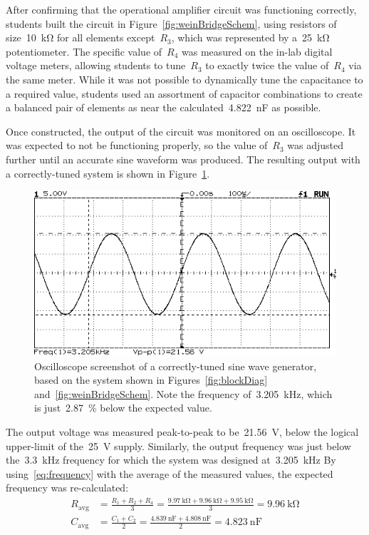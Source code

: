 After confirming that the operational amplifier circuit was functioning
correctly, students built the circuit in Figure~\ref{fig:weinBridgeSchem},
using resistors of size~\SI{10}{\kilo\ohm} for all elements except~$R_3$, which
was represented by a~\SI{25}{\kilo\ohm} potentiometer.  The specific value
of~$R_4$ was measured on the in-lab digital voltage meters, allowing students
to tune~$R_3$ to exactly twice the value of~$R_4$ via the same meter.  While it
was not possible to dynamically tune the capacitance to a required value,
students used an assortment of capacitor combinations to create a balanced pair
of elements as near the calculated~\SI{4.822}{\nano\farad} as possible.

Once constructed, the output of the circuit was monitored on an oscilloscope.
It was expected to not be functioning properly, so the value of~$R_3$ was
adjusted further until an accurate sine waveform was produced.  The resulting
output with a correctly-tuned system is shown in Figure~\ref{fig:goodShot}.
%
\begin{figure}[H]
	\centering
	\includegraphics[width=.6\textwidth]{img/shot/pt2shot.png}
	\parbox{.6\textwidth}{
	\caption[Oscilloscope Screenshot --- Functioning System]{Oscilloscope
	screenshot of a correctly-tuned sine wave generator, based on the system
	shown in Figures~\ref{fig:blockDiag} and~\ref{fig:weinBridgeSchem}.  Note
	the frequency of~\SI{3.205}{\kilo\hertz}, which is just~\SI{2.87}{\percent}
	below the expected value.}
	\label{fig:goodShot}}
\end{figure}
%
The output voltage was measured peak-to-peak to be~\SI{21.56}{\volt}, below the
logical upper-limit of the~\SI{25}{\volt} supply.  Similarly, the output
frequency was just below the~\SI{3.3}{\kilo\hertz} frequency for which the
system was designed at~\SI{3.205}{\kilo\hertz}  By using~\eqref{eq:frequency}
with the average of the measured values, the expected frequency was
re-calculated:
%
\begin{align*}
	R_\text{avg} &= \frac{R_1 + R_2 + R_4}{3}
	             = \frac{\SI{9.97}{\kilo\ohm} + \SI{9.96}{\kilo\ohm} + \SI{9.95}{\kilo\ohm}}{3}
				 = \SI{9.96}{\kilo\ohm}\\
	C_\text{avg} &= \frac{C_1 + C_2}{2}
				 = \frac{\SI{4.839}{\nano\farad} + \SI{4.808}{\nano\farad}}{2}
				 = \SI{4.823}{\nano\farad}
\end{align*}
